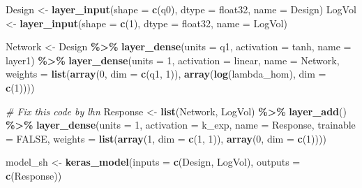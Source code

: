 \documentclass[
]{article}
\newenvironment{Shaded}{\begin{snugshade}}{\end{snugshade}}
\newcommand{\AttributeTok}[1]{\textcolor[rgb]{0.13,0.29,0.53}{#1}}
\newcommand{\CommentTok}[1]{\textcolor[rgb]{0.56,0.35,0.01}{\textit{#1}}}
\newcommand{\ConstantTok}[1]{\textcolor[rgb]{0.56,0.35,0.01}{#1}}
\newcommand{\DecValTok}[1]{\textcolor[rgb]{0.00,0.00,0.81}{#1}}
\newcommand{\FunctionTok}[1]{\textcolor[rgb]{0.13,0.29,0.53}{\textbf{#1}}}
\newcommand{\NormalTok}[1]{#1}
\newcommand{\OtherTok}[1]{\textcolor[rgb]{0.56,0.35,0.01}{#1}}
\newcommand{\SpecialCharTok}[1]{\textcolor[rgb]{0.81,0.36,0.00}{\textbf{#1}}}
\newcommand{\StringTok}[1]{\textcolor[rgb]{0.31,0.60,0.02}{#1}}
\begin{document}
\begin{Shaded}
\begin{Highlighting}[]
\NormalTok{Design  }\OtherTok{\textless{}{-}} \FunctionTok{layer\_input}\NormalTok{(}\AttributeTok{shape =} \FunctionTok{c}\NormalTok{(q0), }\AttributeTok{dtype =} \StringTok{\textquotesingle{}float32\textquotesingle{}}\NormalTok{, }\AttributeTok{name =} \StringTok{\textquotesingle{}Design\textquotesingle{}}\NormalTok{) }
\NormalTok{LogVol  }\OtherTok{\textless{}{-}} \FunctionTok{layer\_input}\NormalTok{(}\AttributeTok{shape =} \FunctionTok{c}\NormalTok{(}\DecValTok{1}\NormalTok{), }\AttributeTok{dtype =} \StringTok{\textquotesingle{}float32\textquotesingle{}}\NormalTok{, }\AttributeTok{name =} \StringTok{\textquotesingle{}LogVol\textquotesingle{}}\NormalTok{)}

\NormalTok{Network }\OtherTok{\textless{}{-}}\NormalTok{ Design }\SpecialCharTok{\%\textgreater{}\%}
  \FunctionTok{layer\_dense}\NormalTok{(}\AttributeTok{units =}\NormalTok{ q1, }\AttributeTok{activation =} \StringTok{\textquotesingle{}tanh\textquotesingle{}}\NormalTok{, }\AttributeTok{name =} \StringTok{\textquotesingle{}layer1\textquotesingle{}}\NormalTok{) }\SpecialCharTok{\%\textgreater{}\%}
  \FunctionTok{layer\_dense}\NormalTok{(}\AttributeTok{units =} \DecValTok{1}\NormalTok{, }\AttributeTok{activation =} \StringTok{\textquotesingle{}linear\textquotesingle{}}\NormalTok{, }\AttributeTok{name =} \StringTok{\textquotesingle{}Network\textquotesingle{}}\NormalTok{,}
              \AttributeTok{weights =} \FunctionTok{list}\NormalTok{(}\FunctionTok{array}\NormalTok{(}\DecValTok{0}\NormalTok{, }\AttributeTok{dim =} \FunctionTok{c}\NormalTok{(q1, }\DecValTok{1}\NormalTok{)), }\FunctionTok{array}\NormalTok{(}\FunctionTok{log}\NormalTok{(lambda\_hom), }\AttributeTok{dim =} \FunctionTok{c}\NormalTok{(}\DecValTok{1}\NormalTok{))))}

\CommentTok{\# Fix this code by lhn}
\NormalTok{Response }\OtherTok{\textless{}{-}} \FunctionTok{list}\NormalTok{(Network, LogVol) }\SpecialCharTok{\%\textgreater{}\%}
  \FunctionTok{layer\_add}\NormalTok{() }\SpecialCharTok{\%\textgreater{}\%}
  \FunctionTok{layer\_dense}\NormalTok{(}\AttributeTok{units =} \DecValTok{1}\NormalTok{, }\AttributeTok{activation =}\NormalTok{ k\_exp, }\AttributeTok{name =} \StringTok{\textquotesingle{}Response\textquotesingle{}}\NormalTok{, }\AttributeTok{trainable =} \ConstantTok{FALSE}\NormalTok{,}
              \AttributeTok{weights =} \FunctionTok{list}\NormalTok{(}\FunctionTok{array}\NormalTok{(}\DecValTok{1}\NormalTok{, }\AttributeTok{dim =} \FunctionTok{c}\NormalTok{(}\DecValTok{1}\NormalTok{, }\DecValTok{1}\NormalTok{)), }\FunctionTok{array}\NormalTok{(}\DecValTok{0}\NormalTok{, }\AttributeTok{dim =} \FunctionTok{c}\NormalTok{(}\DecValTok{1}\NormalTok{))))}

\NormalTok{model\_sh }\OtherTok{\textless{}{-}} \FunctionTok{keras\_model}\NormalTok{(}\AttributeTok{inputs =} \FunctionTok{c}\NormalTok{(Design, LogVol), }\AttributeTok{outputs =} \FunctionTok{c}\NormalTok{(Response))}
\end{Highlighting}
\end{Shaded}
\end{document}
